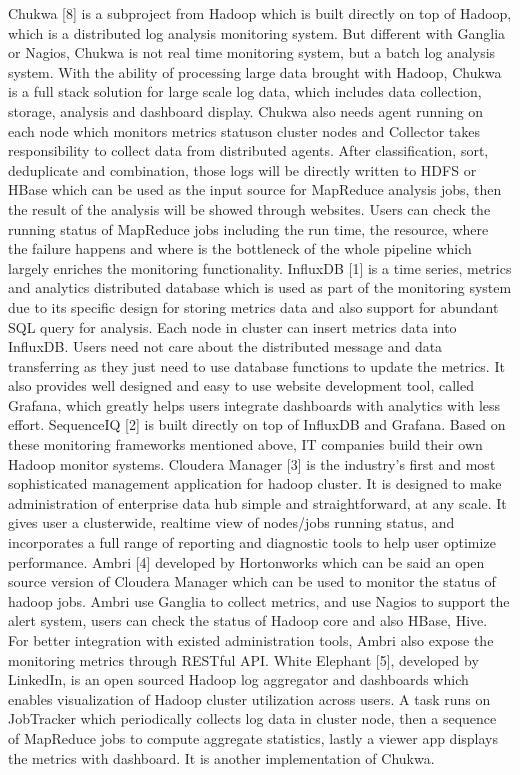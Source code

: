 Chukwa [8] is a subproject from Hadoop which is built directly on top of Hadoop, which is a distributed log analysis monitoring system. But different with Ganglia or Nagios, Chukwa is not real time monitoring system, but a batch log analysis system. With the ability of processing large data brought with Hadoop, Chukwa is a full stack solution for large scale log data, which includes data collection, storage, analysis and dashboard display. Chukwa also needs agent running on each node which monitors metrics statuson cluster nodes and Collector takes responsibility to collect data from distributed agents. After classification, sort, deduplicate and combination, those logs will be directly written to HDFS or HBase which can be used as the input source for MapReduce analysis jobs, then the result of the analysis will be showed through websites. Users can check the running status of MapReduce jobs including the run time, the resource, where the failure happens and where is the bottleneck of the whole pipeline which largely enriches the monitoring functionality.
InfluxDB [1] is a time series, metrics and analytics distributed database which is used as part of the monitoring system due to its specific design for storing metrics data and also support for abundant SQL query for analysis. Each node in cluster can insert metrics data into InfluxDB. Users need not care about the distributed message and data transferring as they just need to use database functions to update the metrics. It also provides well designed and easy to use website development tool, called Grafana, which greatly helps users integrate dashboards with analytics with less effort. SequenceIQ [2] is built directly on top of InfluxDB and Grafana.
Based on these monitoring frameworks mentioned above, IT companies build their own Hadoop monitor systems.
Cloudera Manager [3] is the industry’s first and most sophisticated management application for hadoop cluster. It is designed to make administration of enterprise data hub simple and straightforward, at any scale. It gives user a cluster­wide, real­time view of nodes/jobs running status, and incorporates a full range of reporting and diagnostic tools to help user optimize performance.
Ambri [4] developed by Hortonworks which can be said an open source version of Cloudera Manager which can be used to monitor the status of hadoop jobs. Ambri use Ganglia to collect metrics, and use Nagios to support the alert system, users can check the status of Hadoop core and also HBase, Hive. For better integration with existed administration tools, Ambri also expose the monitoring metrics through RESTful API. White Elephant [5], developed by LinkedIn, is an open sourced Hadoop log aggregator and dashboards which enables visualization of Hadoop cluster utilization across users. A task runs on JobTracker which periodically collects log data in cluster node, then a sequence of MapReduce jobs to compute aggregate statistics, lastly a viewer app displays the metrics with dashboard. It is another implementation of Chukwa.
